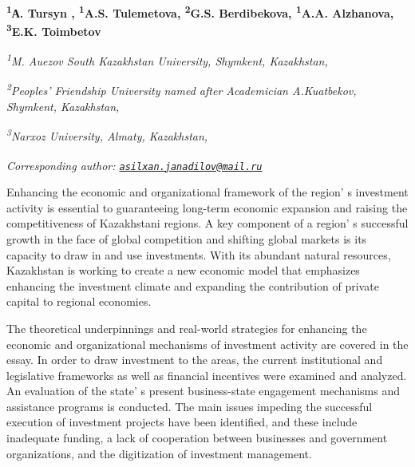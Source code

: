 
\begin{articleheader}

{\bfseries
\textsuperscript{1}А. Tursyn\textsuperscript{\envelope } \authorid,
\textsuperscript{1}A.S. Tulemetova\authorid,
\textsuperscript{2}G.S. Berdibekova\authorid,
\textsuperscript{1}A.A. Alzhanova\authorid,
\textsuperscript{3}E.K. Toimbetov\authorid}
\end{articleheader}

\begin{affiliation}
\emph{\textsuperscript{1}M. Auezov South Kazakhstan University, Shymkent, Kazakhstan,}

\emph{\textsuperscript{2}Peoples'{} Friendship University named after Academician A.Kuatbekov, Shymkent, Kazakhstan,}

\emph{\textsuperscript{3}Narxoz University, Almaty, Kazakhstan,}

\raggedright \emph{{\bfseries \textsuperscript{\envelope }}{\em Corresponding author: \href{mailto:asilxan.janadilov@mail.ru}{\nolinkurl{asilxan.janadilov@mail.ru}}}}
\end{affiliation}

Enhancing the economic and organizational framework of the
region' s investment activity is essential to
guaranteeing long-term economic expansion and raising the
competitiveness of Kazakhstani regions. A key component of a
region' s successful growth in the face of global
competition and shifting global markets is its capacity to draw in and
use investments. With its abundant natural resources, Kazakhstan is
working to create a new economic model that emphasizes enhancing the
investment climate and expanding the contribution of private capital to
regional economies.

The theoretical underpinnings and real-world strategies for enhancing
the economic and organizational mechanisms of investment activity are
covered in the essay. In order to draw investment to the areas, the
current institutional and legislative frameworks as well as financial
incentives were examined and analyzed. An evaluation of the
state' s present business-state engagement mechanisms and
assistance programs is conducted. The main issues impeding the
successful execution of investment projects have been identified, and
these include inadequate funding, a lack of cooperation between
businesses and government \\organizations, and the digitization of
investment management.

